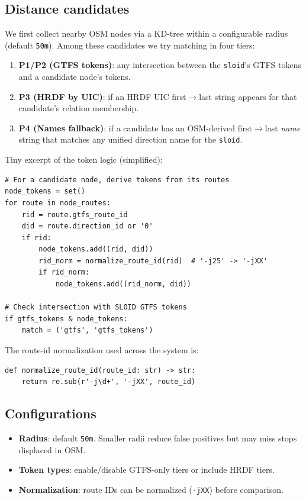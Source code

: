 \subsection{Distance candidates}
We first collect nearby OSM nodes via a KD-tree within a configurable radius (default \texttt{50m}). Among these candidates we try matching in four tiers:
\begin{enumerate}
  \item \textbf{P1/P2 (GTFS tokens)}: any intersection between the \texttt{sloid}'s GTFS tokens and a candidate node's tokens.
  \item \textbf{P3 (HRDF by UIC)}: if an HRDF UIC first$\rightarrow$last string appears for that candidate's relation membership.
  \item \textbf{P4 (Names fallback)}: if a candidate has an OSM-derived first$\rightarrow$last \emph{name} string that matches any unified direction name for the \texttt{sloid}.
\end{enumerate}
Tiny excerpt of the token logic (simplified):
\begin{verbatim}
# For a candidate node, derive tokens from its routes
node_tokens = set()
for route in node_routes:
    rid = route.gtfs_route_id
    did = route.direction_id or '0'
    if rid:
        node_tokens.add((rid, did))
        rid_norm = normalize_route_id(rid)  # '-j25' -> '-jXX'
        if rid_norm:
            node_tokens.add((rid_norm, did))

# Check intersection with SLOID GTFS tokens
if gtfs_tokens & node_tokens:
    match = ('gtfs', 'gtfs_tokens')
\end{verbatim}

The route-id normalization used across the system is:
\begin{verbatim}
def normalize_route_id(route_id: str) -> str:
    return re.sub(r'-j\d+', '-jXX', route_id)
\end{verbatim}

\subsection{Configurations}
\begin{itemize}
  \item \textbf{Radius}: default \texttt{50m}. Smaller radii reduce false positives but may miss stops displaced in OSM.
  \item \textbf{Token types}: enable/disable GTFS-only tiers or include HRDF tiers.
  \item \textbf{Normalization}: route IDs can be normalized (\texttt{-jXX}) before comparison.
\end{itemize}

